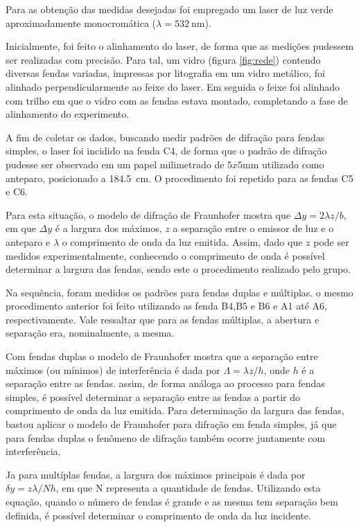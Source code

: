 Para as obtenção das medidas desejadas foi empregado um laser de luz verde aproximadamente monocromática ($\lambda = \SI{532}{\nano\meter}$). 

Inicialmente, foi feito o alinhamento do laser, de forma que as medições pudessem ser realizadas com precisão. Para tal, um vidro (figura \ref{fig:rede}) contendo diversas fendas variadas, impressas por litografia em um vidro metálico, foi alinhado perpendicularmente ao feixe do laser. Em seguida o feixe foi alinhado com trilho em que o vidro com as fendas estava montado, completando a fase de alinhamento do experimento. 



A fim de coletar os dados, buscando medir padrões de difração para fendas simples, o laser foi incidido na fenda C4, de forma que o padrão de difração pudesse ser observado em um papel milimetrado de $5x5\si{\milli\meter}$ utilizado como anteparo, posicionado a \SI{184,5}{\centi\meter}. O procedimento foi repetido para as fendas C5 e C6.

Para esta situação, o modelo de difração de Fraunhofer mostra que $\Delta y = 2\lambda z/b$, em que $\Delta y$ é a largura dos máximos, $z$ a separação entre o emissor de luz e o anteparo e $\lambda$ o comprimento de onda da luz emitida. Assim, dado que $z$ pode ser medidos experimentalmente, conhecendo o comprimento de onda é possível determinar a largura das fendas, sendo este o procedimento realizado pelo grupo.

Na sequência, foram medidos os padrões para fendas duplas e múltiplas. o mesmo procedimento anterior foi feito utilizando as fenda B4,B5 e B6 e A1 até A6, respectivamente. Vale ressaltar que para as fendas múltiplas, a abertura e separação era, nominalmente, a mesma.

Com fendas duplas o modelo de Fraunhofer mostra que a separação entre máximos (ou mínimos) de interferência é dada por $\Lambda = \lambda z/h$, onde $h$ é a separação entre as fendas. assim, de forma análoga ao processo para fendas simples, é possível determinar a separação entre as fendas a partir do comprimento de onda da luz emitida. Para determinação da largura das fendas, bastou aplicar o modelo de Fraunhofer para difração em fenda simples, já que para fendas duplas o fenômeno de difração também ocorre juntamente com interferência.

Ja para multíplas fendas, a largura dos máximos principais é dada por $\delta y = z\lambda/Nh$, em que N representa a quantidade de fendas. Utilizando esta equação, quando o número de fendas é grande e as mesma tem separação bem definida, é possível determinar o comprimento de onda da luz incidente.

